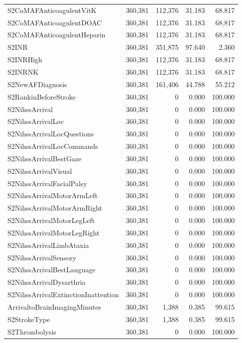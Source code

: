 \begin{longtable}{lrrrr}
S2CoMAFAnticoagulentVitK & 360,381 & 112,376 & 31.183 & 68.817 \\
S2CoMAFAnticoagulentDOAC & 360,381 & 112,376 & 31.183 & 68.817 \\
S2CoMAFAnticoagulentHeparin & 360,381 & 112,376 & 31.183 & 68.817 \\
S2INR & 360,381 & 351,875 & 97.640 & 2.360 \\
S2INRHigh & 360,381 & 112,376 & 31.183 & 68.817 \\
S2INRNK & 360,381 & 112,376 & 31.183 & 68.817 \\
S2NewAFDiagnosis & 360,381 & 161,406 & 44.788 & 55.212 \\
S2RankinBeforeStroke & 360,381 & 0 & 0.000 & 100.000 \\
S2NihssArrival & 360,381 & 0 & 0.000 & 100.000 \\
S2NihssArrivalLoc & 360,381 & 0 & 0.000 & 100.000 \\
S2NihssArrivalLocQuestions & 360,381 & 0 & 0.000 & 100.000 \\
S2NihssArrivalLocCommands & 360,381 & 0 & 0.000 & 100.000 \\
S2NihssArrivalBestGaze & 360,381 & 0 & 0.000 & 100.000 \\
S2NihssArrivalVisual & 360,381 & 0 & 0.000 & 100.000 \\
S2NihssArrivalFacialPalsy & 360,381 & 0 & 0.000 & 100.000 \\
S2NihssArrivalMotorArmLeft & 360,381 & 0 & 0.000 & 100.000 \\
S2NihssArrivalMotorArmRight & 360,381 & 0 & 0.000 & 100.000 \\
S2NihssArrivalMotorLegLeft & 360,381 & 0 & 0.000 & 100.000 \\
S2NihssArrivalMotorLegRight & 360,381 & 0 & 0.000 & 100.000 \\
S2NihssArrivalLimbAtaxia & 360,381 & 0 & 0.000 & 100.000 \\
S2NihssArrivalSensory & 360,381 & 0 & 0.000 & 100.000 \\
S2NihssArrivalBestLanguage & 360,381 & 0 & 0.000 & 100.000 \\
S2NihssArrivalDysarthria & 360,381 & 0 & 0.000 & 100.000 \\
S2NihssArrivalExtinctionInattention & 360,381 & 0 & 0.000 & 100.000 \\
ArrivaltoBrainImagingMinutes & 360,381 & 1,388 & 0.385 & 99.615 \\
S2StrokeType & 360,381 & 1,388 & 0.385 & 99.615 \\
S2Thrombolysis & 360,381 & 0 & 0.000 & 100.000 \\

\end{longtable}
